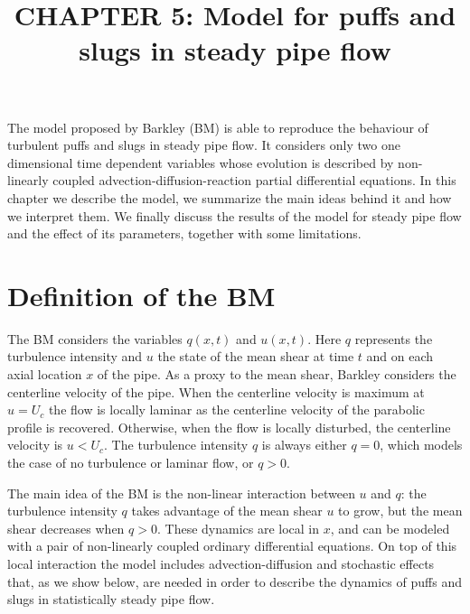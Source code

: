 \documentclass{article}
\title{CHAPTER 5: Model for puffs and slugs in steady pipe flow}
\date{}
\begin{document}
\maketitle
The model proposed by Barkley \cite{barkley2011modeling} (BM) is able to reproduce the behaviour of turbulent puffs and slugs in steady pipe flow. It considers only two one dimensional time dependent variables whose evolution is described by non-linearly coupled advection-diffusion-reaction partial differential equations. In this chapter we describe the model, we summarize the main ideas behind it and how we interpret them. We finally discuss the results of the model for steady pipe flow and the effect of its parameters, together with some limitations. 





\section{Definition of the BM}
The BM considers the variables $q\left(x,t\right)$ and $u\left(x,t\right)$. Here $q$ represents the turbulence intensity and $u$ the state of the mean shear at time $t$ and on each axial location $x$ of the pipe. As a proxy to the mean shear, Barkley considers the centerline velocity of the pipe. When the centerline velocity is maximum at $u=U_{c}$ the flow is locally laminar as the centerline velocity of the parabolic profile is recovered. Otherwise, when the flow is locally disturbed, the centerline velocity is $u < U_{c}$. The turbulence intensity $q$ is always either $q=0$, which models the case of no turbulence or laminar flow, or $q>0$. 

The main idea of the BM is the non-linear interaction between $u$ and $q$: the turbulence intensity $q$ takes advantage of the mean shear $u$ to grow, but the mean shear decreases when $q>0$. These dynamics are local in $x$, and can be modeled with a pair of non-linearly coupled ordinary differential equations. On top of this local interaction the model includes advection-diffusion and stochastic effects that, as we show below, are needed in order to describe the dynamics of puffs and slugs in statistically steady pipe flow. 
\end{document}

